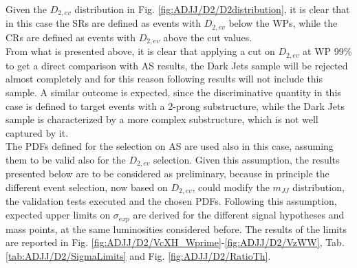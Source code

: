 \noindent Given the $D_{2,ev}$ distribution in Fig. \ref{fig:ADJJ/D2/D2distribution}, it is clear that in this case the SRs are defined as events with $D_{2,ev}$ below the WPs, while the CRs are defined as events with $D_{2,ev}$ above the cut values.\\
From what is presented above, it is clear that applying a cut on $D_{2,ev}$ at WP 99\% to get a direct comparison with AS results, the Dark Jets sample will be rejected almost completely and for this reason following results will not include this sample.
A similar outcome is expected, since the discriminative quantity in this case is defined to target events with a 2-prong substructure, while the Dark Jets sample is characterized by a more complex substructure, which is not well captured by it.\\
The PDFs defined for the selection on AS are used also in this case, assuming them to be valid also for the $D_{2,ev}$ selection.
Given this assumption, the results presented below are to be considered as preliminary, because in principle the different event selection, now based on $D_{2,ev}$, could modify the $m_{JJ}$ distribution, the validation tests executed and the chosen PDFs.
Following this assumption, expected upper limits on $\sigma_{exp}$ are derived for the different signal hypotheses and mass points, at the same luminosities considered before.
The results of the limits are reported in Fig. \ref{fig:ADJJ/D2/VcXH_Wprime}-\ref{fig:ADJJ/D2/VzWW}, Tab. \ref{tab:ADJJ/D2/SigmaLimits} and Fig. \ref{fig:ADJJ/D2/RatioTh}.\\

